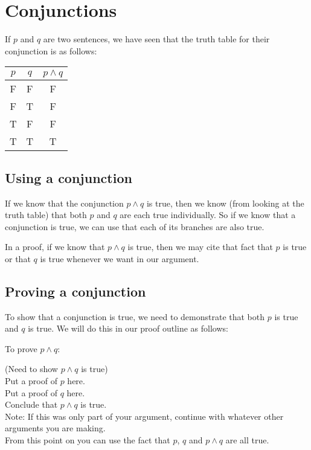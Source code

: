 \documentclass{article}
\begin{document}
 \newpage

\section{Conjunctions}

If $p$ and $q$ are two sentences, we have seen that the truth table for their conjunction is as follows:

\begin{table}[h]
	\centering
	\begin{tabular}{c|c|c}
		$p$ & $q$ & $p \wedge q$ 	\\ \hline
		F & F & F 	\\ \hline
		F & T & F 	\\ \hline
		T & F & F 	\\ \hline
		T &  T & T 	\\ \hline
	\end{tabular}
\end{table}

\subsection{Using a conjunction}  If we know that the conjunction $p \wedge q$ is true, then we know (from looking at the truth table) that both $p$ and $q$ are each true individually.  So if we know that a conjunction is true, we can use that each of its branches are also true.

In a proof, if we know that $p \wedge q$ is true, then we may cite that fact that $p$ is true or that $q$ is true whenever we want in our argument. 

\subsection{Proving a conjunction}  To show that a conjunction is true, we need to demonstrate that both $p$ is true and $q$ is true.  We will do this in our proof outline as follows:

To prove $p \wedge q$:

\begin{fitch*}
		\textrm{(Need to show $p \wedge q$ is true)}\\
		\textrm{Put a proof of $p$ here.}\\
		\textrm{Put a proof of $q$ here.}\\
		\textrm{Conclude that $p \wedge q$ is true.}\\
		\textrm{Note: If this was only part of your argument, continue with whatever other arguments you are making.}\\ \textrm{ \hphantom{Note:}From this point on you can use the fact that $p$, $q$ and $p \wedge q$ are all true.}\\
	\end{fitch*}
\end{document}
